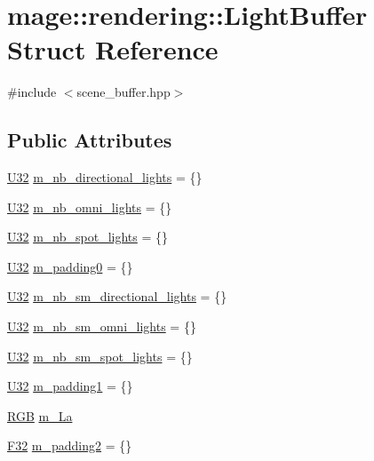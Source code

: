 \hypertarget{structmage_1_1rendering_1_1_light_buffer}{}\section{mage\+:\+:rendering\+:\+:Light\+Buffer Struct Reference}
\label{structmage_1_1rendering_1_1_light_buffer}


{\ttfamily \#include $<$scene\+\_\+buffer.\+hpp$>$}

\subsection*{Public Attributes}
\begin{DoxyCompactItemize}
\item 
\mbox{\hyperlink{namespacemage_aa5d6eaabaac3cdd01873d6a3d27e90f3}{U32}} \mbox{\hyperlink{structmage_1_1rendering_1_1_light_buffer_a4ebd93f25e72d8ba426599e94369547b}{m\+\_\+nb\+\_\+directional\+\_\+lights}} = \{\}
\item 
\mbox{\hyperlink{namespacemage_aa5d6eaabaac3cdd01873d6a3d27e90f3}{U32}} \mbox{\hyperlink{structmage_1_1rendering_1_1_light_buffer_a1a5e40bcec229bad29eacde98f3abe28}{m\+\_\+nb\+\_\+omni\+\_\+lights}} = \{\}
\item 
\mbox{\hyperlink{namespacemage_aa5d6eaabaac3cdd01873d6a3d27e90f3}{U32}} \mbox{\hyperlink{structmage_1_1rendering_1_1_light_buffer_aef25432813d6531689ff6a94e4cf6fcb}{m\+\_\+nb\+\_\+spot\+\_\+lights}} = \{\}
\item 
\mbox{\hyperlink{namespacemage_aa5d6eaabaac3cdd01873d6a3d27e90f3}{U32}} \mbox{\hyperlink{structmage_1_1rendering_1_1_light_buffer_a2e4d47ce07261e4ce1c5bd6a9418bea6}{m\+\_\+padding0}} = \{\}
\item 
\mbox{\hyperlink{namespacemage_aa5d6eaabaac3cdd01873d6a3d27e90f3}{U32}} \mbox{\hyperlink{structmage_1_1rendering_1_1_light_buffer_ad90bc8cb163fe39efcb5c960cb566f16}{m\+\_\+nb\+\_\+sm\+\_\+directional\+\_\+lights}} = \{\}
\item 
\mbox{\hyperlink{namespacemage_aa5d6eaabaac3cdd01873d6a3d27e90f3}{U32}} \mbox{\hyperlink{structmage_1_1rendering_1_1_light_buffer_a1a40cf5d4100b48837cae57ac2f36fcf}{m\+\_\+nb\+\_\+sm\+\_\+omni\+\_\+lights}} = \{\}
\item 
\mbox{\hyperlink{namespacemage_aa5d6eaabaac3cdd01873d6a3d27e90f3}{U32}} \mbox{\hyperlink{structmage_1_1rendering_1_1_light_buffer_a78481c98c9efcdf18ae1254d1fe6f776}{m\+\_\+nb\+\_\+sm\+\_\+spot\+\_\+lights}} = \{\}
\item 
\mbox{\hyperlink{namespacemage_aa5d6eaabaac3cdd01873d6a3d27e90f3}{U32}} \mbox{\hyperlink{structmage_1_1rendering_1_1_light_buffer_a09c3c5f0cd03d1786512403f376cc674}{m\+\_\+padding1}} = \{\}
\item 
\mbox{\hyperlink{structmage_1_1_r_g_b}{R\+GB}} \mbox{\hyperlink{structmage_1_1rendering_1_1_light_buffer_a98c6472d82af27de8b7584ff1c7f98db}{m\+\_\+\+La}}
\item 
\mbox{\hyperlink{namespacemage_aa97e833b45f06d60a0a9c4fc22ae02c0}{F32}} \mbox{\hyperlink{structmage_1_1rendering_1_1_light_buffer_ab0d6f818328072fee8dd7ff4c39a9732}{m\+\_\+padding2}} = \{\}
\end{DoxyCompactItemize}


